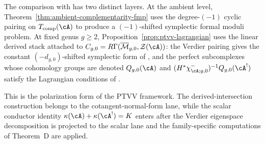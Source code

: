 \begin{remark}
The comparison with \cite{PTVV13} has two distinct layers.
At the ambient level,
Theorem~\ref{thm:ambient-complementarity-fmp}
uses the degree-$(-1)$ cyclic pairing on
$T_{\mathrm{comp}}(\cA)$ to produce a
$(-1)$-shifted symplectic formal moduli problem.
At fixed genus $g\geq2$,
Proposition~\ref{prop:ptvv-lagrangian}
uses the linear derived stack attached to
$C_{g,0}=R\Gamma(\overline{\mathcal{M}}_{g,0},\mathcal{Z}(\cA))$:
the Verdier pairing gives the constant
$(-d_{g,0})$-shifted symplectic form of
\cite[Example~1.4]{PTVV13}, and the perfect subcomplexes whose
cohomology groups are denoted
$Q_{g,0}(\cA)$ and
$(H^*\chi^-_{\cA;g,0})^{-1}Q_{g,0}(\cA^!)$
satisfy the Lagrangian conditions of
\cite[Definition~2.8, Theorem~2.9]{PTVV13}.

This is the polarization form of the PTVV framework.  The
derived-intersection construction belongs to the cotangent-normal-form
lane, while the scalar conductor identity
$\kappa(\cA)+\kappa(\cA^!)=K$ enters after the Verdier eigenspace
decomposition is projected to the scalar lane and the family-specific
computations of Theorem~D are applied.
\end{remark}

